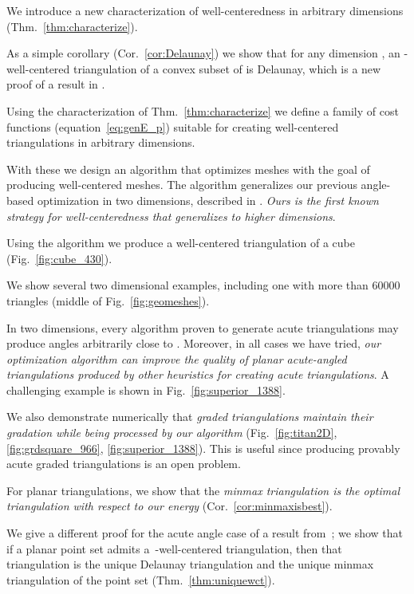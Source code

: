 \documentclass[final]{siamltex}
\begin{document}
\begin{inparaenum}[(a)]
\item We introduce a new characterization of well-centeredness in
  arbitrary dimensions (Thm.~\ref{thm:characterize}). \item As a
  simple corollary (Cor.~\ref{cor:Delaunay}) we show that for any
  dimension , an -well-centered triangulation of a convex subset
  of  is Delaunay, which is a new proof of a result in
  \cite{Rajan1994}.  \item Using the characterization of
  Thm.~\ref{thm:characterize} we define a family of cost functions
   (equation~\ref{eq:genE_p}) suitable for creating well-centered
  triangulations in arbitrary dimensions. \item With these we design
  an algorithm that optimizes meshes with the goal of producing
  well-centered meshes.  The
  algorithm generalizes our previous angle-based optimization in two
  dimensions, described in \cite{VaHiGuRa2007}.  \emph{Ours is the
    first known strategy
    for well-centeredness that generalizes to
    higher dimensions}.
\item Using the algorithm we produce a
  well-centered triangulation of a cube
  (Fig.~\ref{fig:cube_430}).
\item We show several two dimensional examples,
  including one with more than 60000 triangles
  (middle of Fig.~\ref{fig:geomeshes}).
\item  In two dimensions, every algorithm
  proven to generate acute
  triangulations may produce angles arbitrarily close to .
  Moreover, in all cases we have tried, {\emph{our optimization
  algorithm can improve the quality of planar acute-angled
  triangulations produced by other heuristics for creating
  acute triangulations}}.
A challenging example is shown in
  Fig.~\ref{fig:superior_1388}.
\item We also demonstrate numerically
  that \emph{graded triangulations maintain their gradation while
    being processed by our algorithm} (Fig.~\ref{fig:titan2D},
  \ref{fig:grdsquare_966}, \ref{fig:superior_1388}). This is useful
  since producing provably acute graded triangulations is an open
  problem.
\item For planar triangulations, we show that the \emph{minmax
    triangulation \cite{EdTaWa1992} is the optimal triangulation with
    respect to our energy}  (Cor.~\ref{cor:minmaxisbest}).
\item 
We give a different proof for the acute angle case of a result
from~\cite{BeEp1995}; we show that if a planar point set admits
a~-well-centered triangulation, then that triangulation is
the unique Delaunay triangulation and
the unique minmax triangulation of the point set
(Thm.~\ref{thm:uniquewct}).
\end{inparaenum}
\end{document}
